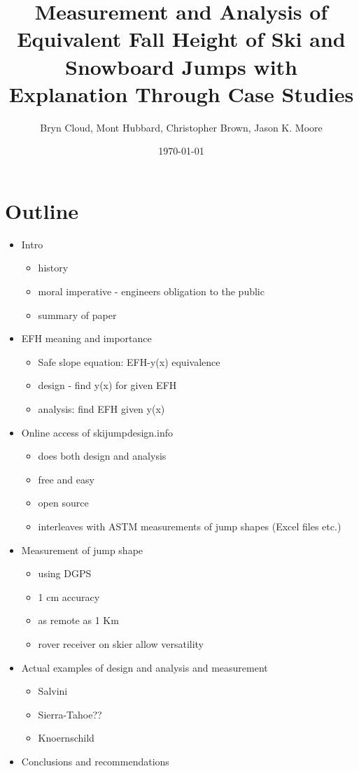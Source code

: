 \documentclass{article}
\title{Measurement and Analysis of Equivalent Fall Height of Ski and Snowboard Jumps with Explanation Through Case Studies}
\author{Bryn Cloud, Mont Hubbard, Christopher Brown, Jason K. Moore}
\date{\today}
\begin{document}
\maketitle

\section*{Outline}
%
\begin{itemize}
  \item Intro
  \begin{itemize}
    \item history
    \item moral imperative - engineers obligation to the public
    \item summary of paper
  \end{itemize}
  \item EFH meaning and importance
  \begin{itemize}
    \item Safe slope equation: EFH-y(x) equivalence
    \item design - find y(x) for given EFH
    \item analysis: find EFH given y(x)
  \end{itemize}
  \item Online access of skijumpdesign.info
  \begin{itemize}
    \item does both design and analysis
    \item free and easy
    \item open source
    \item interleaves with ASTM measurements of jump shapes (Excel files etc.)
  \end{itemize}
  \item Measurement of jump shape
  \begin{itemize}
    \item using DGPS
    \item 1 cm accuracy
    \item as remote as 1 Km
    \item rover receiver on skier allow versatility
  \end{itemize}
  \item Actual examples of design and analysis and measurement
  \begin{itemize}
    \item Salvini
    \item Sierra-Tahoe??
    \item Knoernschild
  \end{itemize}
  \item Conclusions and recommendations
\end{itemize}
\end{document}
